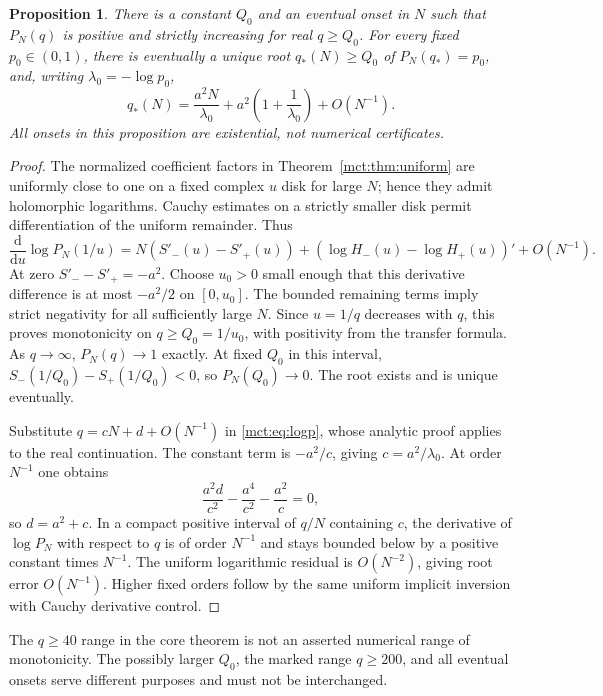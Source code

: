 \documentclass[11pt]{article}
\newtheorem{proposition}[theorem]{Proposition}
\theoremstyle{definition}
\newcommand{\dd}{\mathrm d}
\begin{document}
\begin{proposition}\label{mct:prop:paletteroot}
There is a constant $Q_0$ and an eventual onset in $N$ such that $P_N(q)$ is positive and strictly increasing for real $q\ge Q_0$. For every fixed $p_0\in(0,1)$, there is eventually a unique root $q_*(N)\ge Q_0$ of $P_N(q_*)=p_0$, and, writing $\lambda_0=-\log p_0$,
\begin{equation}\label{mct:eq:paletteinverse}
 q_*(N)=\frac{a^2N}{\lambda_0}+a^2\left(1+\frac1{\lambda_0}\right)+O(N^{-1}).
\end{equation}
All onsets in this proposition are existential, not numerical certificates.
\end{proposition}
\begin{proof}
The normalized coefficient factors in Theorem~\ref{mct:thm:uniform} are uniformly close to one on a fixed complex $u$ disk for large $N$; hence they admit holomorphic logarithms. Cauchy estimates on a strictly smaller disk permit differentiation of the uniform remainder. Thus
\[
 \frac{\dd}{\dd u}\log P_N(1/u)
 =N(S'_-(u)-S'_+(u))+(\log H_-(u)-\log H_+(u))'+O(N^{-1}).
\]
At zero $S'_--S'_+=-a^2$. Choose $u_0>0$ small enough that this derivative difference is at most $-a^2/2$ on $[0,u_0]$. The bounded remaining terms imply strict negativity for all sufficiently large $N$. Since $u=1/q$ decreases with $q$, this proves monotonicity on $q\ge Q_0=1/u_0$, with positivity from the transfer formula. As $q\to\infty$, $P_N(q)\to1$ exactly. At fixed $Q_0$ in this interval, $S_-(1/Q_0)-S_+(1/Q_0)<0$, so $P_N(Q_0)\to0$. The root exists and is unique eventually.

Substitute $q=cN+d+O(N^{-1})$ in \eqref{mct:eq:logp}, whose analytic proof applies to the real continuation. The constant term is $-a^2/c$, giving $c=a^2/\lambda_0$. At order $N^{-1}$ one obtains
\[
 \frac{a^2d}{c^2}-\frac{a^4}{c^2}-\frac{a^2}{c}=0,
\]
so $d=a^2+c$. In a compact positive interval of $q/N$ containing $c$, the derivative of $\log P_N$ with respect to $q$ is of order $N^{-1}$ and stays bounded below by a positive constant times $N^{-1}$. The uniform logarithmic residual is $O(N^{-2})$, giving root error $O(N^{-1})$. Higher fixed orders follow by the same uniform implicit inversion with Cauchy derivative control.
\end{proof}
The $q\ge40$ range in the core theorem is not an asserted numerical range of monotonicity. The possibly larger $Q_0$, the marked range $q\ge200$, and all eventual onsets serve different purposes and must not be interchanged.
\end{document}

